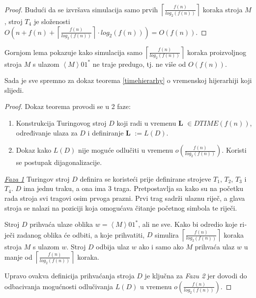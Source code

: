 \documentclass[12pt]{rectors}
\begin{document}
\begin{otherlanguage}{croatian}
\begin{proof}
Budući da se izvršava simulacija samo prvih $\left \lceil{\frac {f(n)}{log_2(f(n))} }\right \rceil$ koraka stroja $M$, stroj $T_4$ je složenosti $O \left (n + f(n) + \left \lceil{\frac {f(n)}{log_2(f(n))} }\right \rceil \cdot log_2(f(n)) \right ) = O(f(n))$.

\end{proof}
Gornjom lema pokazuje kako simulacija samo $\left \lceil{\frac {f(n)}{log_2(f(n))} }\right \rceil$ koraka proizvoljnog stroja $M$ s ulazom
$\left< M \right>01^*$ ne traje predugo, tj. ne više od $O(f(n))$.

\vspace{1cm}
Sada je sve spremno za dokaz teorema \ref{timehierarhy} o vremenskoj hijerarhiji koji 
slijedi.

\begin{proof}
Dokaz teorema provodi se u 2 faze:
\begin{enumerate}
    \item Konstrukcija Turingovog stroj $D$ koji radi u vremenu 
\textbf{L} $\in DTIME(f\left ( n \right ) )$, određivanje ulaza za $D$ i definiranje 
\textbf{L} $:= L(D)$.
    \item Dokaz kako $L(D)$ nije moguće odlučiti u 
vremenu $o(\frac {f\left ( n \right )}{log_2\left ( f\left ( n \right ) \right )} )$. Koristi se postupak dijagonalizacije.
\end{enumerate} 

\underline{\textit{Faza 1}}\newline
Turingov stroj $D$ definira se koristeći prije definirane strojeve $T_1$, $T_2$, $T_3$ i $T_4$. 
$D$ ima jednu traku, a 
ona ima 3 traga. Pretpostavlja sa kako su na početku rada stroja svi tragovi osim prvoga prazni.
Prvi trag sadrži ulaznu riječ, a glava stroja se nalazi na poziciji koja omogućava čitanje
početnog simbola te riječi.

Stroj $D$ prihvaća ulaze oblika $ w = \left < M \right >01^*$, ali ne sve. 
Kako bi odredio koje riječi zadanog oblika će odbiti, a koje prihvatiti, $D$ simulira $\left \lceil{\frac {f(n)}{log_2(f(n))} }\right \rceil$ koraka stroja $M$ s ulazom $w$.
Stroj $D$ odbija ulaz $w$ ako i samo ako $M$ prihvaća ulaz $w$ u manje od $\left \lceil{\frac {f(n)}{log_2(f(n))} }\right \rceil$ koraka.

Upravo ovakva definicija prihvaćanja stroja $D$ je ključna za \textit{Fazu 2} jer dovodi do odbacivanja mogućnosti odlučivanja
$L(D)$ u vremenu $o \left (\frac{ f(n)}{log_2(f(n)) } \right )$.
\vspace{.5cm}


\end{proof}
\end{otherlanguage}
\end{document}
